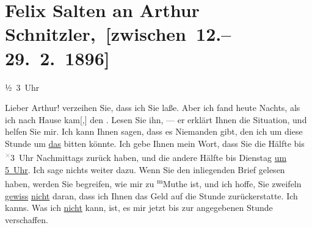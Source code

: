 

\renewcommand{\erwaehnteOrte}{Orte: Berlin, Wien}
\renewcommand{\erwaehnteWerke}{}
\section[ Felix Salten an Arthur Schnitzler, {[}zwischen 12.–29. 2. 1896{]}]{Felix Salten an Arthur Schnitzler, {[}zwischen 12.–29. 2. 1896{]}}
\nopagebreak{}
\rehead{ }\normalsize\beginnumbering{}
\toendnotes[C]{\smallbreak\pagebreak[2]}
\toendnotes[C]{\smallbreak}
\pstart
           \raggedleft{}{\pb}½ 3 Uhr\pend
           
\pstart
           Lieber Arthur! verzeihen Sie, dass ich Sie \label{K_L03168-1v}\label{K_L03168-1h} laße. Aber ich fand heute{ }Nachts, als ich nach Hause kam{[},{]} den \label{K_L03168-2v}\label{K_L03168-2h}. Lesen Sie ihn, — er erklärt
               Ihnen die Situation, und helfen Sie mir. Ich kann Ihnen sagen, dass es Niemanden
               gibt, den ich um diese Stunde um \uline{das} bitten könnte.
               Ich gebe Ihnen mein Wort, dass Sie die Hälfte bis \substVorne{}\textsuperscript{\textcolor{gray}{×}}\substDazwischen{}3\substHinten{} Uhr Nachmittags zurück haben, und die andere Hälfte bis
                  Dienstag{ }{\pb}\uline{um 5 Uhr}. Ich sage nichts weiter dazu. Wenn Sie den inliegenden Brief gelesen haben,
               werden Sie begreifen, wie mir zu \substVorne{}\textsuperscript{m}\substDazwischen{}M\substHinten{}uthe ist, und ich hoffe, Sie zweifeln \uline{gewiss}{ }\uline{nicht} daran, dass ich Ihnen das Geld auf die Stunde
               zurückerstatte. Ich kanns. Was ich \uline{nicht} kann, ist,
               es mir jetzt bis zur angegebenen Stunde verschaffen.\pend
           
